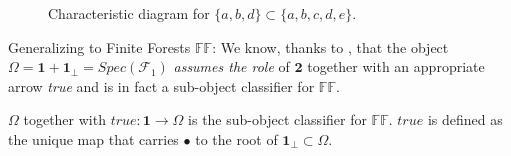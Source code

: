 \begin{figure}[h]
	\centering
{}
	\caption{Characteristic diagram for  $\{a,b,d\} \subset \{a,b,c,d,e\}$.}
\end{figure}




	\newpage
	Generalizing to Finite Forests $\mathbb{FF}$: We know, thanks to \cite{towards}, that the object $\Omega = \textbf{1} + \textbf{1}_\bot = Spec(\mathcal{F}_1)$ \emph{assumes the role} of $\textbf{2}$ together with an appropriate arrow \emph{true} and is in fact a sub-object classifier for $ \mathbb{FF}$.
	
\begin{thm}
	$\Omega$ together with $true: \mathbf{1} \rightarrow \Omega$ is the sub-object classifier for $\mathbb{FF}$. \newline
	$true$ is defined as the unique map that carries $\bullet$ to the root of $\textbf{1}_\bot \subset \Omega$.
\end{thm}

